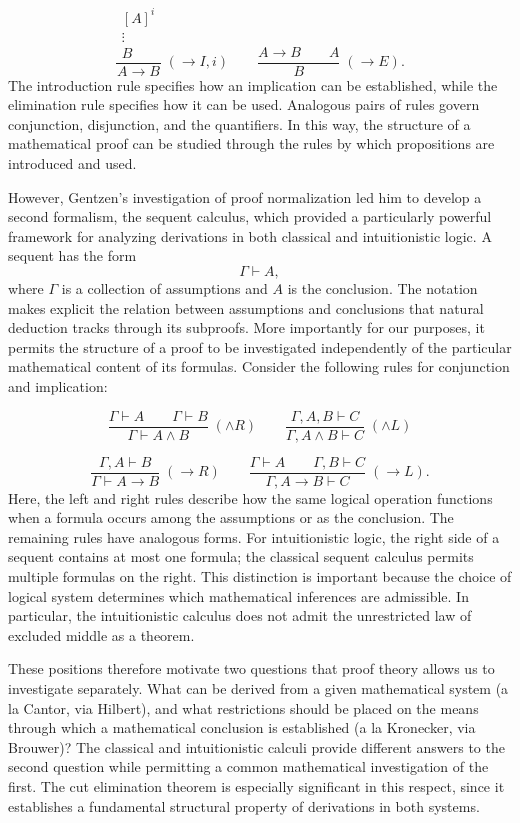 \documentclass{article}
\begin{document}
\[
\frac{
  \begin{array}{c}
  [A]^i\\
  \vdots\\
  B
  \end{array}
}{
  A\to B
}\;(\to I,i)
\qquad
\frac{A\to B\qquad A}{B}\;(\to E).
\]
The introduction rule specifies how an implication can be established, while the elimination rule specifies how it can be 
used. Analogous pairs of rules govern conjunction, disjunction, and the quantifiers. In this way, the structure of a 
mathematical proof can be studied through the rules by which propositions are introduced and used.

However, Gentzen's investigation of proof normalization led him to develop a second formalism, the sequent calculus, 
which provided a particularly powerful framework for analyzing derivations in both classical and intuitionistic logic. 
A sequent has the form
\[
\Gamma\vdash A,
\]
where $\Gamma$ is a collection of assumptions and $A$ is the conclusion. The notation makes explicit the relation between 
assumptions and conclusions that natural deduction tracks through its subproofs. More importantly for our purposes, it 
permits the structure of a proof to be investigated independently of the particular mathematical content of its formulas.
Consider the following rules for conjunction and implication:

\[
\frac{\Gamma\vdash A\qquad\Gamma\vdash B}
     {\Gamma\vdash A\land B}\;(\land R)
\qquad
\frac{\Gamma,A,B\vdash C}
     {\Gamma,A\land B\vdash C}\;(\land L)
\]

\[
\frac{\Gamma,A\vdash B}
     {\Gamma\vdash A\to B}\;(\to R)
\qquad
\frac{\Gamma\vdash A\qquad\Gamma,B\vdash C}
     {\Gamma,A\to B\vdash C}\;(\to L).
\]
Here, the left and right rules describe how the same logical operation functions when a formula occurs among the assumptions 
or as the conclusion. The remaining rules have analogous forms. For intuitionistic logic, the right side of a sequent 
contains at most one formula; the classical sequent calculus permits multiple formulas on the right. This distinction is 
important because the choice of logical system determines which mathematical inferences are admissible. 
In particular, the intuitionistic calculus does not admit the unrestricted law of excluded middle as a theorem.

These positions therefore motivate two questions that proof theory allows us to investigate separately. What can be 
derived from a given mathematical system (a la Cantor, via Hilbert), and what restrictions should be placed on the means 
through which a mathematical conclusion is established (a la Kronecker, via Brouwer)? The classical and intuitionistic 
calculi provide different answers to the second question while permitting a common mathematical investigation of the first. 
The cut elimination theorem is especially significant in this respect, since it establishes a fundamental structural 
property of derivations in both systems.
\end{document}
